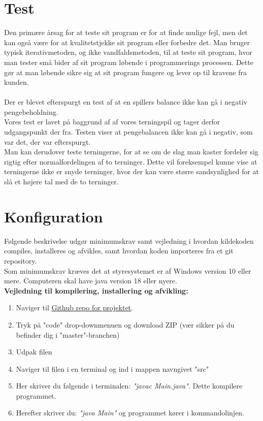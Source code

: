 \documentclass{article}
\begin{document}
 
\section{Test}
Den primære årsag for at teste sit program er for at finde mulige fejl, men det kan også være for at kvalitetstjekke sit program eller forbedre det. Man bruger typisk iterativmetoden, og ikke vandfaldsmetoden, til at teste sit program, hvor man tester små bider af sit program løbende i programmerings processen. Dette gør at man løbende sikre sig at sit program fungere og lever op til kravene fra kunden. 
\\
\\Der er blevet efterspurgt en test af at en spillers balance ikke kan gå i negativ pengebeholdning.
\\Vores test er lavet på baggrund af af vores terningspil og tager derfor udgangspunkt der fra. Testen viser at pengebalancen ikke kan gå i negativ, som var det, der var efterspurgt.
\\
Man kan derudover teste terningerne, for at se om de slag man kaster fordeler sig rigtig efter normalfordelingen af to terninger. Dette vil foreksempel kunne vise at terningerne ikke er snyde terninger, hvor der kan være større sandsynlighed for at slå et højere tal med de to terninger. 

\section{Konfiguration}
Følgende beskrivelse udgør minimumskrav samt vejledning i hvordan kildekoden compiles, installeres og afvikles, samt hvordan koden importeres fra et git repository.\\
Som minimumskrav kræves det at styresystemet er af Windows version 10 eller mere. Computeren skal have java version 18 eller nyere.\\
 \textbf{Vejledning til kompilering, installering og afvikling:}
\begin{enumerate}
    \item Naviger til \href{https://github.com/Jakob-SA/CDIO-2}{Github repo for projektet}.
    \item Tryk på "code" drop-downmenuen og download ZIP (vær sikker på du befinder dig i "master"-branchen)
    \item Udpak filen
    \item Naviger til filen i en terminal og ind i mappen navngivet "src"
    \item Her skriver du følgende i terminalen: \textit{"javac Main.java"}. Dette kompilere programmet.
    \item Herefter skriver du: \textit{"java Main"} og programmet kører i kommandolinjen.
\end{enumerate}
\end{document}
